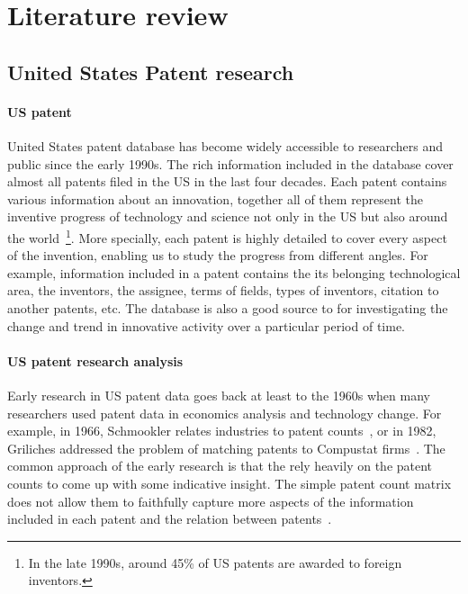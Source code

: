 \section{Literature review}

\subsection{United States Patent research}

\paragraph{US patent} United States patent database has become widely accessible to researchers and public since the early 1990s. The rich information included in the database cover almost all patents filed in the US in the last four decades. Each patent contains various information about an innovation, together all of them represent the inventive progress of technology and science not only in the US but also around the world~\footnote{In the late 1990s, around 45\% of US patents are awarded to foreign inventors.}. More specially, each patent is highly detailed to cover every
aspect of the invention, enabling us to study the progress from different angles. For example, information included in a patent contains the its belonging technological area, the inventors, the assignee,  terms of fields, types of inventors, citation to another patents, etc.
The database is also a good source to for investigating the change and trend in innovative activity over a particular period of time. 


\paragraph{US patent research analysis} Early research in US patent data goes
back at least to the 1960s when many researchers used patent data in economics
analysis and technology change. For example, in 1966,  Schmookler relates
industries to patent counts~\cite{Schmookler1966}, or in 1982, Griliches
addressed the problem of matching patents to Compustat
firms~\cite{Griliches1982}. The common approach of the early research is that
the rely heavily on the patent counts to come up with some indicative insight.
The simple patent count matrix does not allow them to faithfully capture more
aspects of the information included in each patent and the relation between
patents~\cite{Griliches1987}.

